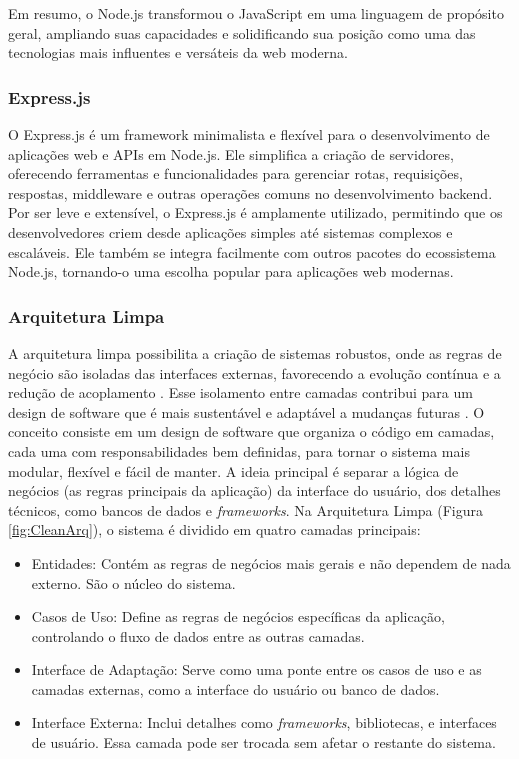 Em resumo, o Node.js transformou o JavaScript em uma linguagem de propósito geral, ampliando suas capacidades e solidificando sua posição como uma das tecnologias mais influentes e versáteis da web moderna.

\subsubsection{Express.js}

O Express.js é um framework minimalista e flexível para o desenvolvimento de aplicações web e APIs em Node.js. Ele simplifica a criação de servidores, oferecendo ferramentas e funcionalidades para gerenciar rotas, requisições, respostas, middleware e outras operações comuns no desenvolvimento backend. Por ser leve e extensível, o Express.js é amplamente utilizado, permitindo que os desenvolvedores criem desde aplicações simples até sistemas complexos e escaláveis. Ele também se integra facilmente com outros pacotes do ecossistema Node.js, tornando-o uma escolha popular para aplicações web modernas.

\subsubsection{Arquitetura Limpa}

A arquitetura limpa possibilita a criação de sistemas robustos, onde as regras de negócio são isoladas das interfaces externas, favorecendo a evolução contínua e a redução de acoplamento \cite{silva2018arquiteturalimpa}. Esse isolamento entre camadas contribui para um design de software que é mais sustentável e adaptável a mudanças futuras \cite{martins2017arquiteturaclean}. O conceito consiste em um design de software que organiza o código em camadas, cada uma com responsabilidades bem definidas, para tornar o sistema mais modular, flexível e fácil de manter. A ideia principal é separar a lógica de negócios (as regras principais da aplicação) da interface do usuário, dos detalhes técnicos, como bancos de dados e \textit{frameworks}. Na Arquitetura Limpa (Figura \ref{fig:CleanArq}), o sistema é dividido em quatro camadas principais:

    \begin{itemize}
        \item Entidades: Contém as regras de negócios mais gerais e não dependem de nada externo. São o núcleo do sistema.
        \item Casos de Uso: Define as regras de negócios específicas da aplicação, controlando o fluxo de dados entre as outras camadas.
        \item Interface de Adaptação: Serve como uma ponte entre os casos de uso e as camadas externas, como a interface do usuário ou banco de dados.
        \item Interface Externa: Inclui detalhes como \textit{frameworks}, bibliotecas, e interfaces de usuário. Essa camada pode ser trocada sem afetar o restante do sistema.
    \end{itemize}

